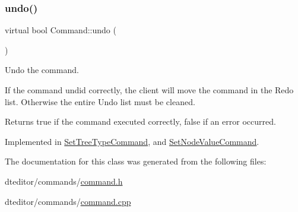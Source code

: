 \mbox{\label{class_command_aa89348c98fd2194f1617d70f57a3ae6c}} 
\subsubsection{\texorpdfstring{undo()}{undo()}}
{\footnotesize\ttfamily virtual bool Command\+::undo (\begin{DoxyParamCaption}{ }\end{DoxyParamCaption})\hspace{0.3cm}{\ttfamily [pure virtual]}}



Undo the command. 

If the command undid correctly, the client will move the command in the Redo list. Otherwise the entire Undo list must be cleaned. \begin{DoxyReturn}{Returns}
true if the command executed correctly, false if an error occurred. 
\end{DoxyReturn}


Implemented in \mbox{\hyperlink{class_set_tree_type_command_ac6538d32b00404cfca61d6f28bf7b854}{Set\+Tree\+Type\+Command}}, and \mbox{\hyperlink{class_set_node_value_command_a794bfa7e64469fa6528179d2ca807cc3}{Set\+Node\+Value\+Command}}.



The documentation for this class was generated from the following files\+:\begin{DoxyCompactItemize}
\item 
dteditor/commands/\mbox{\hyperlink{command_8h}{command.\+h}}\item 
dteditor/commands/\mbox{\hyperlink{command_8cpp}{command.\+cpp}}\end{DoxyCompactItemize}
